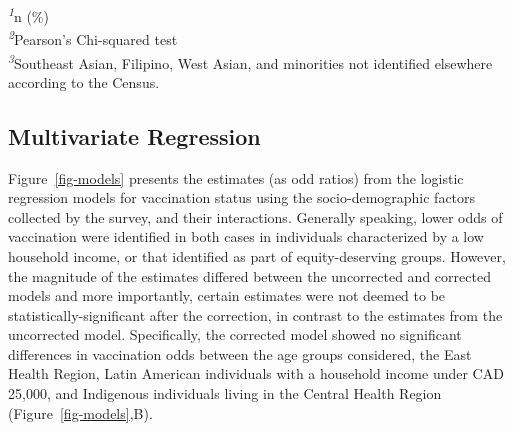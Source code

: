 \documentclass[
  letterpaper,
  DIV=11,
  numbers=noendperiod]{scrartcl}
\begin{document}
\begin{minipage}{\linewidth}
\textsuperscript{\textit{1}}n (\%)\\
\textsuperscript{\textit{2}}Pearson's Chi-squared test\\
\textsuperscript{\textit{3}}Southeast Asian, Filipino, West Asian,
and minorities not identified elsewhere according to the Census.\\
\end{minipage}

\hypertarget{multivariate-regression}{%
\subsection{Multivariate Regression}\label{multivariate-regression}}

Figure~\ref{fig-models} presents the estimates (as odd ratios) from the
logistic regression models for vaccination status using the
socio-demographic factors collected by the survey, and their
interactions. Generally speaking, lower odds of vaccination were
identified in both cases in individuals characterized by a low household
income, or that identified as part of equity-deserving groups. However,
the magnitude of the estimates differed between the uncorrected and
corrected models and more importantly, certain estimates were not deemed
to be statistically-significant after the correction, in contrast to the
estimates from the uncorrected model. Specifically, the corrected model
showed no significant differences in vaccination odds between the age
groups considered, the East Health Region, Latin American individuals
with a household income under CAD 25,000, and Indigenous individuals
living in the Central Health Region (Figure~\ref{fig-models},B).
\end{document}
